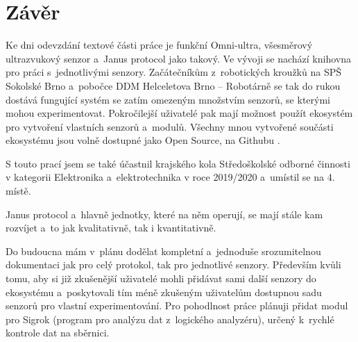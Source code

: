 \newpage
\chapter*{Závěr}

Ke dni odevzdání textové části práce je funkční Omni-ultra, všesměrový ultrazvukový senzor a~Janus protocol jako takový.
Ve vývoji se nachází knihovna pro práci s~jednotlivými senzory.
Začátečníkům z~robotických kroužků na SPŠ Sokolské Brno \cite{sokolska} a~pobočce DDM Helceletova Brno -- Robotárně \cite{robotarna} se tak do rukou dostává fungující systém se zatím omezeným množstvím senzorů, se kterými mohou experimentovat.
Pokročilejší uživatelé pak mají možnost použít ekosystém pro vytvoření vlastních senzorů a~modulů.
Všechny mnou vytvořené součásti ekosystému jsou volně dostupné jako Open Source, na Githubu \cite{protocol}.

S touto prací jsem se také účastnil krajského kola Středoškolské odborné činnosti v kategorii Elektronika a~elektrotechnika v roce 2019/2020 a~umístil se na 4. místě.


Janus protocol a~hlavně jednotky, které na něm operují, se mají stále kam rozvíjet a~to jak kvalitativně, tak i kvantitativně.

Do budoucna mám v~plánu dodělat kompletní a~jednoduše srozumitelnou dokumentaci jak pro celý protokol, tak pro jednotlivé senzory.
Především kvůli tomu, aby si již zkušenější uživatelé mohli přidávat sami další senzory do ekosystému a~poskytovali tím méně zkušeným uživatelům dostupnou sadu senzorů pro vlastní experimentování.
Pro pohodlnost práce plánuji přidat modul pro Sigrok (program pro analýzu dat z~logického analyzéru), určený k~rychlé kontrole dat na sběrnici.
